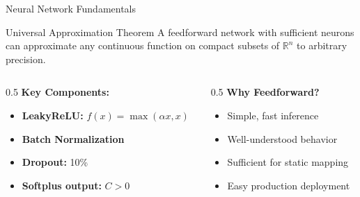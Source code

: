 \documentclass{beamer}
\begin{document}
\begin{frame}{Neural Network Fundamentals}
    \begin{block}{Universal Approximation Theorem}
        A feedforward network with sufficient neurons can approximate any continuous function on compact subsets of $\mathbb{R}^n$ to arbitrary precision.
    \end{block}

    \vspace{0.3cm}

    \begin{columns}
        \begin{column}{0.5\textwidth}
            \textbf{Key Components:}
            \begin{itemize}
                \item \textbf{LeakyReLU:} $f(x) = \max(\alpha x, x)$
                \item \textbf{Batch Normalization}
                \item \textbf{Dropout:} 10\%
                \item \textbf{Softplus output:} $C > 0$
            \end{itemize}
        \end{column}
        \begin{column}{0.5\textwidth}
            \textbf{Why Feedforward?}
            \begin{itemize}
                \item Simple, fast inference
                \item Well-understood behavior
                \item Sufficient for static mapping
                \item Easy production deployment
            \end{itemize}
        \end{column}
    \end{columns}
\end{frame}
\end{document}
